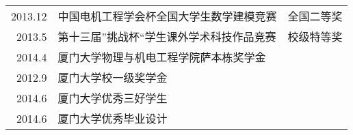\documentclass[letterpaper]{deedy-resume} %
\begin{document}
\begin{minipage}[t]{0.65\textwidth}
\begin{tabular}{rll}
2013.12 &中国电机工程学会杯全国大学生数学建模竞赛& 全国二等奖    \\
2013.5  &第十三届”挑战杯“学生课外学术科技作品竞赛&           校级特等奖    \\
2014.4  &厦门大学物理与机电工程学院萨本栋奖学金& \\
2012.9  &厦门大学校一级奖学金&       \\
2014.6  &厦门大学优秀三好学生&       \\
2014.6  &厦门大学优秀毕业设计&       \\
\end{tabular}

\sectionspace %


\end{minipage} %








\end{document}
